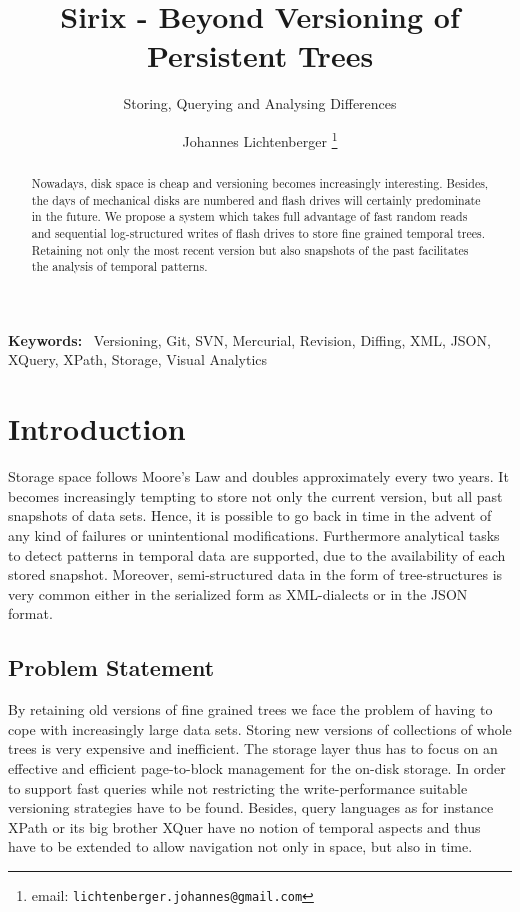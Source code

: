 \documentclass[10pt,twoside,a4paper,twocolumn,abstracton]{scrartcl}
\newenvironment{keywords}%
   {\begin{trivlist}\item[]{\bfseries\sffamily Keywords:}\ }
   {\end{trivlist}}
\begin{document}
\title{Sirix - Beyond Versioning of Persistent Trees}
\subtitle{Storing, Querying and Analysing Differences}
\author{Johannes Lichtenberger \thanks{email: \texttt{lichtenberger.johannes@gmail.com}}}

\maketitle

\begin{abstract}
Nowadays, disk space is cheap and versioning becomes increasingly interesting. Besides, the days of mechanical disks are numbered and flash drives will certainly predominate in the future. We propose a system which takes full advantage of fast random reads and sequential log-structured writes of flash drives to store fine grained temporal trees. Retaining not only the most recent version but also snapshots of the past facilitates the analysis of temporal patterns.
\end{abstract}

\begin{keywords}
Versioning, Git, SVN, Mercurial, Revision, Diffing, XML, JSON, XQuery, XPath, Storage, Visual Analytics
\end{keywords}

\section{Introduction}
Storage space follows Moore's Law and doubles approximately every two years. It becomes increasingly tempting to store not only the current version, but all past snapshots of data sets. Hence, it is possible to go back in time in the advent of any kind of failures or unintentional modifications. Furthermore analytical tasks to detect patterns in temporal data are supported, due to the availability of each stored snapshot. Moreover, semi-structured data in the form of tree-structures is very common either in the serialized form as XML-dialects or in the JSON format.

\subsection{Problem Statement}
By retaining old versions of fine grained trees we face the problem of having to cope with increasingly large data sets. Storing new versions of collections of whole trees is very expensive and inefficient. The storage layer thus has to focus on an effective and efficient page-to-block management for the on-disk storage. In order to support fast queries while not restricting the write-performance suitable versioning strategies have to be found. Besides, query languages as for instance XPath or its big brother XQuer have no notion of temporal aspects and thus have to be extended to allow navigation not only in space, but also in time.
\end{document}
